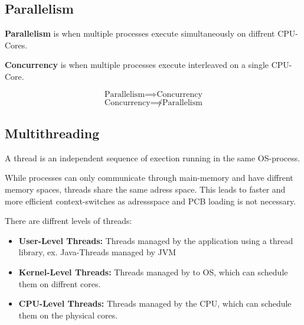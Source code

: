 \subsection{Parallelism}

\begin{definition}

\textbf{Parallelism } is when multiple processes execute simultaneously on diffrent CPU-Cores.
            
\end{definition}

\begin{definition}

\textbf{Concurrency } is when multiple processes execute interleaved on a single CPU-Core.
            
\end{definition}

\begin{remark}
$$\text{Parallelism} \implies \text{Concurrency}$$
$$\text{Concurrency} \not\implies \text{Parallelism}$$
\end{remark}

\subsection{Multithreading}

\begin{definition}
A thread is an independent sequence of exection running in the same OS-process.     
\end{definition}

\begin{remark}
While processes can only communicate through main-memory and have diffrent memory spaces, threads share
the same adress space. This leads to faster and more efficient context-switches as adressspace and PCB loading is not necessary.
\end{remark}

There are diffrent levels of threads:
\begin{itemize}
    \item \textbf{User-Level Threads: } Threads managed by the application using a thread library, ex. Java-Threads managed by JVM
    \item \textbf{Kernel-Level Threads: }Threads managed by to OS, which can schedule them on diffrent cores.
    \item \textbf{CPU-Level Threads:} Threads managed by the CPU, which can schedule them on the physical cores.
\end{itemize}

